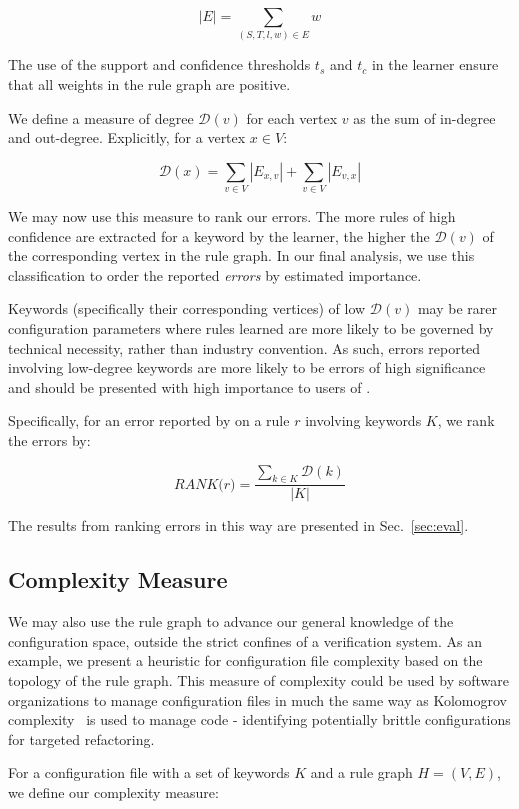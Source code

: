     $$|E| = \sum_{(S, T, l, w) \in E} w$$

The use of the support and confidence thresholds $t_s$ and $t_c$ in the learner ensure 
that all weights in the rule graph are positive.

We define a measure of degree $\mathcal{D}(v)$ for each vertex $v$ as the sum of 
in-degree and out-degree. Explicitly, for a vertex $x \in V$:

    $$\mathcal{D}(x) = \sum_{v \in V} |E_{x, v}| + \sum_{v \in V} |E_{v, x}|$$

We may now use this measure to rank our errors.
The more rules of high confidence are extracted for a keyword by the learner, 
the higher the $\mathcal{D}(v)$ of the corresponding vertex in the rule graph.
In our final analysis, we use this classification to
order the reported {\it errors} by estimated importance.

Keywords (specifically their corresponding vertices)
of low $\mathcal{D}(v)$ may be rarer configuration
parameters where rules learned are more likely to be governed by 
technical necessity, rather than industry convention. As such, errors
reported involving low-degree keywords are more likely to be errors
of high significance and should be presented with high importance
to users of \app.

Specifically, for an error reported by \app on a rule $r$ involving
keywords $K$, we rank the errors by:

    $$\textit{RANK(r)} = \frac{\sum_{k \in K} \mathcal{D}(k)}{|K|}$$

The results from ranking errors in this way are presented in Sec.~\ref{sec:eval}.

\subsection{Complexity Measure}

We may also use the rule graph to advance our general knowledge
of the configuration space, outside the strict confines of a
verification system. As an example, we present a heuristic
for configuration file complexity based on the topology of the
rule graph. This measure of complexity could be used by software
organizations to manage configuration files in much the same way
as Kolomogrov complexity~\cite{kolmogorov1965} is used to manage code - identifying
potentially brittle configurations for targeted refactoring.

For a configuration file with a set of keywords $K$
and a rule graph $H = (V, E)$, we define our complexity measure:

